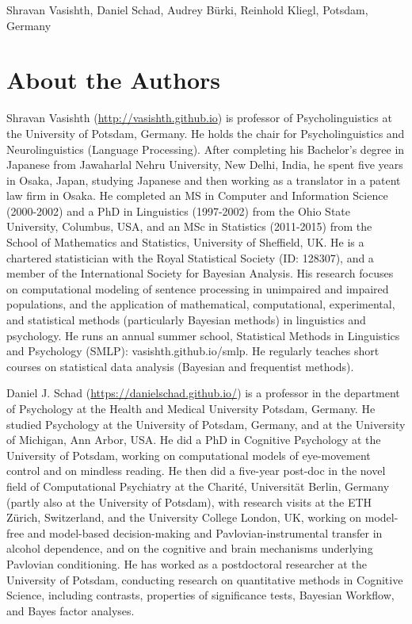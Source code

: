 \documentclass[
  12pt,
]{krantz}
\theoremstyle{definition}
\theoremstyle{definition}
\theoremstyle{definition}
\theoremstyle{definition}
\theoremstyle{remark}
\begin{document}
\begin{flushright}
Shravan Vasishth,
Daniel Schad,
Audrey Bürki,
Reinhold Kliegl,
Potsdam, Germany
\end{flushright}

\hypertarget{about-the-authors}{%
\chapter*{About the Authors}\label{about-the-authors}}


Shravan Vasishth (\url{http://vasishth.github.io}) is professor of Psycholinguistics at the University of Potsdam, Germany. He holds the chair for Psycholinguistics and Neurolinguistics (Language Processing). After completing his Bachelor's degree in Japanese from Jawaharlal Nehru University, New Delhi, India, he spent five years in Osaka, Japan, studying Japanese and then working as a translator in a patent law firm in Osaka. He completed an MS in Computer and Information Science (2000-2002) and a PhD in Linguistics (1997-2002) from the Ohio State University, Columbus, USA, and an MSc in Statistics (2011-2015) from the School of Mathematics and Statistics, University of Sheffield, UK. He is a chartered statistician with the Royal Statistical Society (ID: 128307), and a member of the International Society for Bayesian Analysis. His research focuses on computational modeling of sentence processing in unimpaired and impaired populations, and the application of mathematical, computational, experimental, and statistical methods (particularly Bayesian methods) in linguistics and psychology. He runs an annual summer school, Statistical Methods in Linguistics and Psychology (SMLP): vasishth.github.io/smlp. He regularly teaches short courses on statistical data analysis (Bayesian and frequentist methods).

Daniel J. Schad (\url{https://danielschad.github.io/}) is a professor in the department of Psychology at the Health and Medical University Potsdam, Germany. He studied Psychology at the University of Potsdam, Germany, and at the University of Michigan, Ann Arbor, USA. He did a PhD in Cognitive Psychology at the University of Potsdam, working on computational models of eye-movement control and on mindless reading. He then did a five-year post-doc in the novel field of Computational Psychiatry at the Charité, Universität Berlin, Germany (partly also at the University of Potsdam), with research visits at the ETH Zürich, Switzerland, and the University College London, UK, working on model-free and model-based decision-making and Pavlovian-instrumental transfer in alcohol dependence, and on the cognitive and brain mechanisms underlying Pavlovian conditioning. He has worked as a postdoctoral researcher at the University of Potsdam, conducting research on quantitative methods in Cognitive Science, including contrasts, properties of significance tests, Bayesian Workflow, and Bayes factor analyses.
\end{document}
